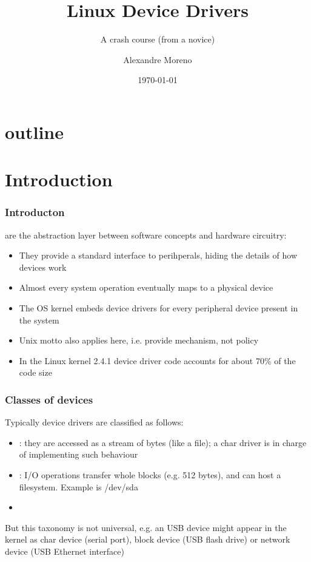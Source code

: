 \documentclass[xcolor=dvipsnames,compress]{beamer}
\title[linux device drivers intro]{Linux Device Drivers}
\subtitle{A crash course (from a novice)}
\author{Alexandre Moreno}
\institute[Seenergy]{SEEnergy Corp.\\
   \texttt{alexandre@seenergy.com.tw}
}
\date{\today}
\begin{document}
\begin{frame}[plain]
   \titlepage
\end{frame}

\section*{outline}
\begin{frame}
   \tableofcontents
\end{frame}

\section[intro]{Introduction}
\begin{frame}
\frametitle{Introducton}
     are the abstraction layer between software concepts and hardware circuitry:
    \begin{itemize}
    \item They provide a standard interface to perihperals, hiding the details of how devices work
    \item Almost every system operation eventually maps to a physical device
    \item The OS kernel embeds device drivers for every peripheral device present in the system
    \item Unix motto also applies here, i.e. provide mechanism, not policy
    \item In the Linux kernel 2.4.1 device driver code accounts for about 70\% of the code size
    \end{itemize}
\end{frame}

\begin{frame}
\frametitle{Classes of devices}
    Typically device drivers are classified as follows:
    \begin{itemize}
    \item {}: they are accessed as a stream of bytes (like a file); a char driver is in charge of implementing such behaviour
    \item {}: I/O operations transfer whole blocks (e.g. 512 bytes), and can host a filesystem. Example is /dev/sda
    \item {}\\
    \end{itemize}
    But this taxonomy is not universal, e.g. an USB device might appear in the kernel as char device (serial port), 
    block device (USB flash drive) or network device (USB Ethernet interface)\\
\end{frame}
\end{document}
